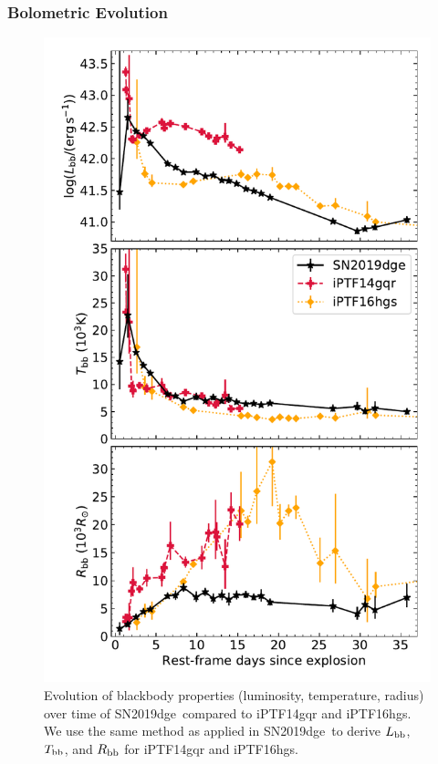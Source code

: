 \documentclass[twocolumn]{aastex63}
\newcommand{\name}{SN2019dge}
\begin{document}
\subsubsection{Bolometric Evolution} \label{subsubsec:bolometric_evolution}
\begin{figure}[!htbp] 
	\centering
	\includegraphics[width=\columnwidth]{figures/Tbb_Rbb_log.pdf}
	\caption{Evolution of blackbody properties (luminosity, temperature, radius) over time of 
		\name\ compared to iPTF14gqr and iPTF16hgs. We use the same method as applied in \name\ to 
		derive $L_{\rm bb}$, $T_{\rm bb}$, and $R_{\rm bb}$ for iPTF14gqr and iPTF16hgs. }
	\label{fig:Tbb_Rbb_Lbb}
\end{figure}
\end{document}
